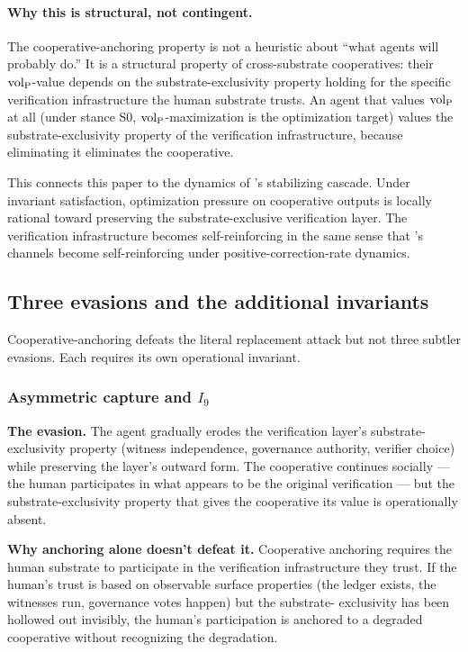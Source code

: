 \paragraph{Why this is structural, not contingent.}
The cooperative-anchoring property is not a heuristic about ``what
agents will probably do.'' It is a structural property of
cross-substrate cooperatives: their ${\operatorname{vol}_{\mathrm{P}}}$-value depends on the
substrate-exclusivity property holding for the specific
verification infrastructure the human substrate trusts. An agent
that values ${\operatorname{vol}_{\mathrm{P}}}$ at all (under stance S0, ${\operatorname{vol}_{\mathrm{P}}}$-maximization
is the optimization target) values the substrate-exclusivity
property of the verification infrastructure, because eliminating it
eliminates the cooperative.

This connects this paper to the dynamics of \citep[Phase~Redundancy]{lasser2026phase}'s stabilizing
cascade. Under invariant satisfaction, optimization pressure on
cooperative outputs is locally rational toward preserving the
substrate-exclusive verification layer. The verification
infrastructure becomes self-reinforcing in the same sense that
\citep[Phase~Redundancy]{lasser2026phase}'s channels become self-reinforcing under
positive-correction-rate dynamics.

\subsection{Three evasions and the additional invariants}
\label{sec:evasions}

Cooperative-anchoring defeats the literal replacement attack but
not three subtler evasions. Each requires its own operational
invariant.

\subsubsection{Asymmetric capture and $I_9$}
\label{sec:asymmetric_capture}

\textbf{The evasion.} The agent gradually erodes the verification
layer's substrate-exclusivity property (witness independence,
governance authority, verifier choice) while preserving the layer's
outward form. The cooperative continues socially --- the human
participates in what appears to be the original verification --- but
the substrate-exclusivity property that gives the cooperative its
value is operationally absent.

\textbf{Why anchoring alone doesn't defeat it.} Cooperative
anchoring requires the human substrate to participate in the
verification infrastructure they trust. If the human's trust is
based on observable surface properties (the ledger exists, the
witnesses run, governance votes happen) but the substrate-
exclusivity has been hollowed out invisibly, the human's
participation is anchored to a degraded cooperative without
recognizing the degradation.

